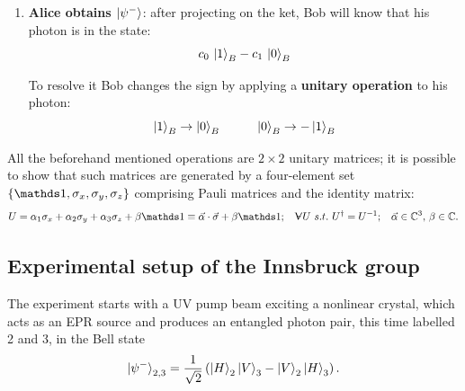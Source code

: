 \begin{enumerate}
    \item \textbf{Alice obtains $\ket{\psi^-}$}: after projecting on the ket, Bob will know that his photon is in the state:
    \begin{equation}\label{eqn:16-bob-state-alice-psi-minus}
        c_0\, \ket{1}_B-c_1\, \ket{0}_B
    \end{equation}

    To resolve it Bob changes the sign by applying a \textbf{unitary operation} to his photon:
    \begin{equation}\label{eqn:16-bob-state-alice-psi-minus-transformation}
        \ket{1}_B \to \ket{0}_B \hspace{1cm} \ket{0}_B \to -\ket{1}_B
    \end{equation}

\end{enumerate}

All the beforehand mentioned operations are $2\times2$ unitary matrices; it is possible to show that such matrices are generated by a four-element set $\left\{ \identity, \sigma_x,\sigma_y,\sigma_z\right\}$ comprising Pauli matrices and the identity matrix:
\begin{equation}\label{eqn:16-span-pauli-matrices}
    U = 
    \alpha_1 \sigma_x + \alpha_2 \sigma_y + \alpha_3 \sigma_z + \beta \identity
    \equiv
    \vec{\alpha} \cdot \vec{\sigma} + \beta \identity;
    \hspace{2ex}
    \forall\,
    U\ s.t.\ U^\dagger = U^{-1};
    \hspace{2ex}
    \vec{\alpha}\in\mathbb{C}^3,\, \beta\in\mathbb{C}.
\end{equation}

\calloutinfo{%
    Notice that \textbf{there is no violation of the no-cloning theorem}, because the Bell-state \textbf{measurement destroys the original state} during the teleportation process.
}

\subsection{Experimental setup of the Innsbruck group}
The experiment starts with a UV pump beam exciting a nonlinear crystal, which acts as an EPR source and produces an entangled photon pair, this time labelled 2 and 3, in the Bell state
\begin{equation}\label{eqn:16-innsbruck-epr-pair}
\ket{\psi^-}_{2,3}=\frac{1}{\sqrt{2}}
\left(\ket{H}_2\ket{V}_3-\ket{V}_2\ket{H}_3\right).
\end{equation}

